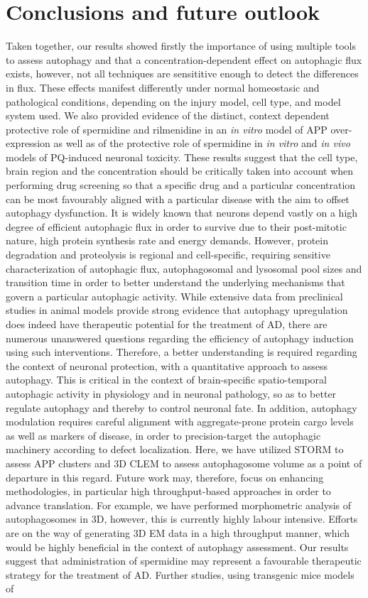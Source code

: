 \section{Conclusions and future outlook}
Taken together, our results showed firstly the importance of using multiple tools to assess autophagy and that a concentration-dependent effect on autophagic flux exists, however, not all techniques are sensititive enough to detect the differences in flux. These effects manifest differently under normal homeostasic and pathological conditions, depending on the injury model, cell type, and model system used. We also provided evidence of the distinct, context dependent protective role of spermidine and rilmenidine in an \textit{in vitro} model of APP over-expression as well as of the protective role of spermidine in \textit{in vitro} and \textit{in vivo} models of PQ-induced neuronal toxicity. These results suggest that the cell type, brain region and the concentration should be critically taken into account when performing drug screening so that a specific drug and a particular concentration can be most favourably aligned with a particular disease with the aim to offset autophagy dysfunction. It is widely known that neurons depend vastly on a high degree of efficient autophagic flux in order to survive due to their post-mitotic nature, high protein synthesis rate and energy demands. However, protein degradation and proteolysis is regional and cell-specific, requiring sensitive characterization of autophagic flux, autophagosomal and lysosomal pool sizes and transition time  in order to better understand the underlying mechanisms that govern a particular autophagic activity. While extensive data from preclinical studies in animal models provide strong evidence that autophagy upregulation does indeed have therapeutic potential for the treatment of AD, there are numerous unanswered questions regarding the efficiency of autophagy induction using such interventions. Therefore, a better understanding is required regarding the context of neuronal protection, with a quantitative approach to assess autophagy. This is critical in the context of brain-specific spatio-temporal autophagic activity in physiology and in neuronal pathology, so as to better regulate autophagy and thereby to control neuronal fate. In addition, autophagy modulation requires careful alignment with aggregate-prone protein cargo levels as well as markers of disease, in order to precision-target the autophagic machinery according to defect localization. Here, we have utilized STORM to assess APP clusters and 3D CLEM to assess autophagosome volume as a point of departure in this regard. Future work may, therefore, focus on enhancing methodologies, in particular high throughput-based approaches in order to advance translation. For example, we have performed morphometric analysis of autophagosomes in 3D, however, this is currently highly labour intensive. Efforts are on the way of generating 3D EM data in a high throughput manner, which would be highly beneficial in the context of autophagy assessment. Our results suggest that administration of spermidine may represent a favourable therapeutic strategy for the treatment of AD. Further studies, using transgenic mice models of 